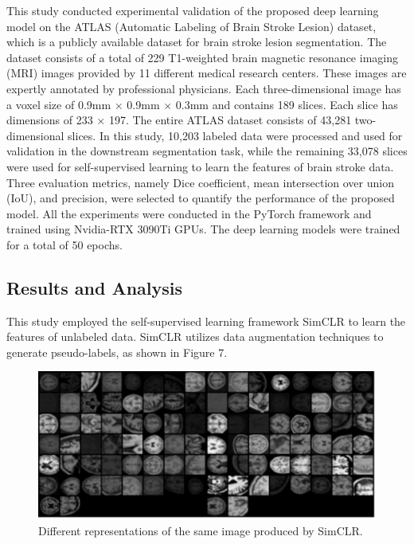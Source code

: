 \documentclass[10pt,twocolumn,letterpaper]{article}
\begin{document}
This study conducted experimental validation of the proposed deep learning model on the ATLAS (Automatic Labeling of Brain Stroke Lesion) dataset\cite{ATLAS}, which is a publicly available dataset for brain stroke lesion segmentation. The dataset consists of a total of 229 T1-weighted brain magnetic resonance imaging (MRI) images provided by 11 different medical research centers. These images are expertly annotated by professional physicians. Each three-dimensional image has a voxel size of 0.9mm $\times$ 0.9mm $\times$ 0.3mm and contains 189 slices. Each slice has dimensions of 233 $\times$ 197. The entire ATLAS dataset consists of 43,281 two-dimensional slices. In this study, 10,203 labeled data were processed and used for validation in the downstream segmentation task, while the remaining 33,078 slices were used for self-supervised learning to learn the features of brain stroke data.
Three evaluation metrics, namely Dice coefficient, mean intersection over union (IoU), and precision, were selected to quantify the performance of the proposed model.
All the experiments were conducted in the PyTorch framework and trained using Nvidia-RTX 3090Ti GPUs. The deep learning models were trained for a total of 50 epochs.

\subsection{Results and Analysis}

This study employed the self-supervised learning framework SimCLR to learn the features of unlabeled data. SimCLR utilizes data augmentation techniques to generate pseudo-labels, as shown in Figure 7.

\begin{figure}[htbp]   %
	\centering
	\includegraphics[width=\linewidth,scale=1.00]{Images/DR_SimCLR.png}
	\caption{Different representations of the same image produced by SimCLR.}
  \label{fig:dr_simclr}
\end{figure}
\end{document}
